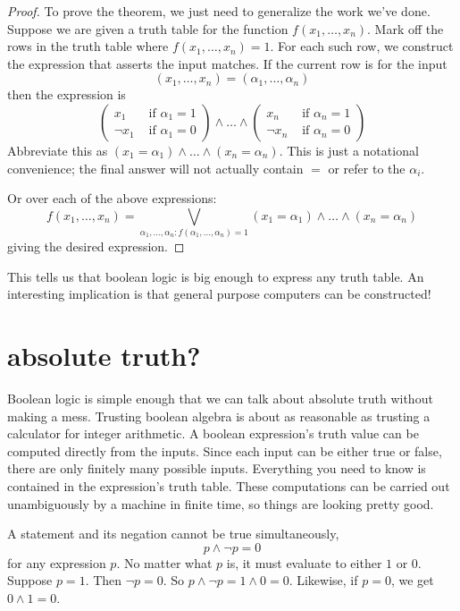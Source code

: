 \message{ !name(truth.tex)}\documentclass{scrbook}
\begin{document}
\begin{proof}
To prove the theorem, we just need to generalize the work we've done. Suppose we are given a truth table for the function $f(x_1,\dots, x_n)$. Mark off the rows in the truth table where $f(x_1,\dots,x_n)=1$. For each such row, we construct the expression that asserts the input matches. If the current row is for the input
\[
(x_1,\dots, x_n)=(\alpha_1,\dots, \alpha_n)
\]
then the expression is
\[
\left (
  \begin{matrix}
    x_1 & \textrm{ if } \alpha_1=1 \\
    \neg x_1 & \textrm { if } \alpha_1=0
  \end{matrix}
\right)
\wedge
\dots
\wedge
\left (
  \begin{matrix}
    x_n & \textrm{ if } \alpha_n=1 \\
    \neg x_n & \textrm { if } \alpha_n=0
  \end{matrix}
\right)
\]
Abbreviate this as $(x_1=\alpha_1)\wedge \dots \wedge (x_n=\alpha_n)$. This is just a notational convenience; the final answer will not actually contain $=$ or refer to the $\alpha_i$. 

Or over each of the above expressions: 
\[
f(x_1,\dots,x_n)= \bigvee_{\alpha_1,\dots,\alpha_n: f(\alpha_1,\dots,\alpha_n)=1} (x_1=\alpha_1)\wedge \dots \wedge (x_n=\alpha_n)
\]
giving the desired expression. 
\end{proof}
This tells us that boolean logic is big enough to express any truth table. An interesting implication is that general purpose computers can be constructed!
\section[Absolute Truth?]{absolute truth?}
Boolean logic is simple enough that we can talk about absolute truth without making a mess. Trusting boolean algebra is about as reasonable as trusting a calculator for integer arithmetic. 
A boolean expression's truth value can be computed directly from the inputs. Since each input can be either true or false, there are only finitely many possible inputs. Everything you need to know is contained in the expression's truth table. These computations can be carried out unambiguously by a machine in finite time, so things are looking pretty good.

A statement and its negation cannot be true simultaneously, \ie
\[
p \wedge \neg p = 0
\]
for any expression $p$. No matter what $p$ is, it must evaluate to either $1$ or $0$. Suppose $p=1$. Then $\neg p=0$. So $p\wedge \neg p = 1 \wedge 0 =0$. Likewise, if $p=0$, we get $0\wedge 1=0$. 
\end{document}

